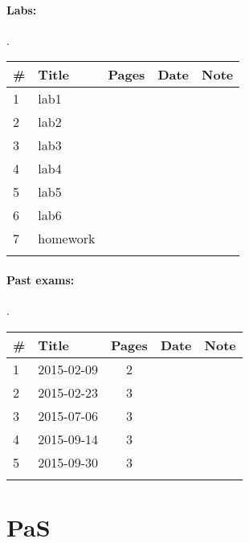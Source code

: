 \documentclass[a4paper,12pt]{article} %
\begin{document}
\paragraph{Labs:}.\\
\begin{tabularx}{\textwidth}{|l|X|c|l|c|}
	\hline
	\# & Title & Pages & Date & Note \\
	\hline
	1 & lab1 &  &  &  \\
	\hline
	2 & lab2 &  &  &  \\
	\hline
	3 & lab3 &  &  &  \\
	\hline
	4 & lab4 &  &  &  \\
	\hline
	5 & lab5 &  &  &  \\
	\hline
	6 & lab6 &  &  &  \\
	\hline
	7 & homework &  &  &  \\
	\hline
	&  &  &  &  \\
	\hline
\end{tabularx}

\paragraph{Past exams:}.\\
\begin{tabularx}{\textwidth}{|l|X|c|l|c|}
	\hline
	\# & Title & Pages & Date & Note \\
	\hline
	1 & 2015-02-09 & 2 &  &  \\
	\hline
	2 & 2015-02-23 & 3 &  &  \\
	\hline
	3 & 2015-07-06 & 3 &  &  \\
	\hline
	4 & 2015-09-14 & 3 &  &  \\
	\hline
	5 & 2015-09-30 & 3 &  &  \\
	\hline
	&  &  &  &  \\
	\hline
\end{tabularx}

\newpage
\section{PaS}
\end{document}
